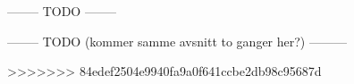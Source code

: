 
-------- TODO --------



-------- TODO (kommer samme avsnitt to ganger her?) ---------



>>>>>>> 84edef2504e9940fa9a0f641ccbe2db98c95687d
